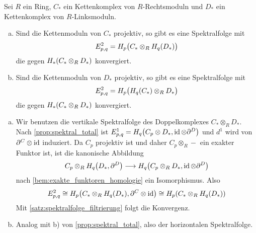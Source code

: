\begin{proposition}[{name=[{Spektralfolgen zum Tensorprodukt von Kettenkomplexen}]},label=prop:spektralfolgen_konv_homlo_tensor]
	Sei $R$ ein Ring, $C_*$ ein Kettenkomplex von $R$-Rechtsmoduln und $D_*$ ein Kettenkomplex von $R$-Linksmoduln.
	\begin{enumerate}[a)]
		\item Sind die Kettenmoduln von $C_*$ projektiv, so gibt es eine Spektralfolge mit 
		\[
			E^2_{p,q} = H_p \enbrace[\big]{C_* \otimes_R H_q(D_*)} 
		\]
		die gegen $H_* \enbrace*{C_* \otimes_R D_{*}}$ konvergiert.
		\item Sind die Kettenmoduln von $D_*$ projektiv, so gibt es eine Spektralfolge mit 
		\[
			E^2_{p,q} = H_p \enbrace[\big]{H_q(C_*) \otimes_R D_*} 
		\]
		die gegen $H_* \enbrace*{C_* \otimes_R D_*}$ konvergiert.
	\end{enumerate}
\end{proposition}
\begin{beweis}
	\leavevmode
	\begin{enumerate}[a)]
		\item Wir benutzen die vertikale Spektralfolge des Doppelkomplexes $C_* \otimes_R D_*$.
		Nach \autoref{prop:spektral_total} ist $E^1_{p,q}= H_q \enbrace*{C_p \otimes D_*, \id \otimes \partial^D}$ und $d^1$ wird von $\partial^C \otimes \id$ induziert.
		Da $C_p$ projektiv ist und daher $C_p \otimes_R -$ ein exakter Funktor ist, ist die kanonische Abbildung 
		\[
			C_p \otimes_R H_q \enbrace*{D_*,\partial^D} \longrightarrow H_q \enbrace*{C_p \otimes_R D_*, \id \otimes \partial^D} 
		\]
		nach \autoref{bem:exakte_funktoren_homologie} ein Isomorphismus. Also 
		\[
			E^2_{p,q} \cong H_p \enbrace*{C_* \otimes_R H_q(D_*), \partial^C \otimes \id} \cong H_p \enbrace*{C_* \otimes_R H_q(D_*)}
		\]
		Mit \autoref{satz:spektralfolge_filtrierung} folgt die Konvergenz.
		\item Analog mit b) von \autoref{prop:spektral_total}, also der horizontalen Spektralfolge.\qedhere
	\end{enumerate}
\end{beweis}

